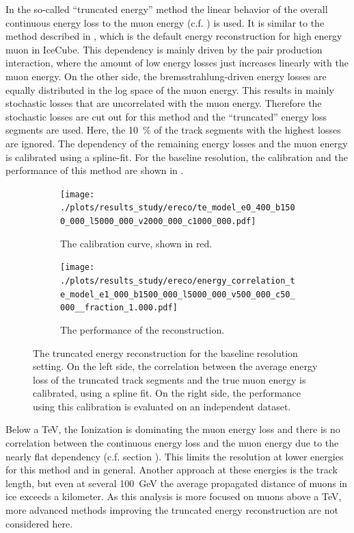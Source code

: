 In the so-called \enquote{truncated energy} method the linear behavior of the overall continuous energy loss to the muon energy (c.f. ) is used.
It is similar to the method described in \cite{IceCube2014Ereco}, which is the default energy reconstruction for high energy muon in IceCube.
This dependency is mainly driven by the pair production interaction, where the amount of low energy losses just increases linearly with the muon energy.
On the other side, the bremsstrahlung-driven energy losses are equally distributed in the log space of the muon energy.
This results in mainly stochastic losses that are uncorrelated with the muon energy.
Therefore the stochastic losses are cut out for this method and the \enquote{truncated} energy loss segments are used.
Here, the \SI{10}{\%} of the track segments with the highest losses are ignored.
The dependency of the remaining energy losses and the muon energy is calibrated using a spline-fit.
For the baseline resolution, the calibration and the performance of this method are shown in .
\begin{figure}
    \centering
    \begin{subfigure}{0.47\textwidth}
        \centering
        \texttt{[image: ./plots/results\_study/ereco/te\_model\_e0\_400\_b1500\_000\_l5000\_000\_v2000\_000\_c1000\_000.pdf]}
        \caption{The calibration curve, shown in red.}
        \label{fig:study_ereco_trunc_calib_base}
    \end{subfigure}
    \hfill
    \begin{subfigure}{0.47\textwidth}
        \centering
        \texttt{[image: ./plots/results\_study/ereco/energy\_correlation\_te\_model\_e1\_000\_b1500\_000\_l5000\_000\_v500\_000\_c50\_000\_\_fraction\_1.000.pdf]}
        \caption{The performance of the reconstruction.}
        \label{fig:study_ereco_trunc_perf_base}
    \end{subfigure}
    \caption{The truncated energy reconstruction for the baseline resolution setting. On the left side, the correlation between the average energy loss of the truncated track segments and the true muon energy is calibrated, using a spline fit. On the right side, the performance using this calibration is evaluated on an independent dataset.}
    \label{fig:study_ereco_trunc}
\end{figure}

Below a TeV, the Ionization is dominating the muon energy loss and there is no correlation between the continuous energy loss and the muon energy due to the nearly flat dependency (c.f. section ).
This limits the resolution at lower energies for this method and in general.
Another approach at these energies is the track length, but even at several \SI{100}{GeV} the average propagated distance of muons in ice exceeds a kilometer.
As this analysis is more focused on muons above a TeV, more advanced methods improving the truncated energy reconstruction are not considered here.

